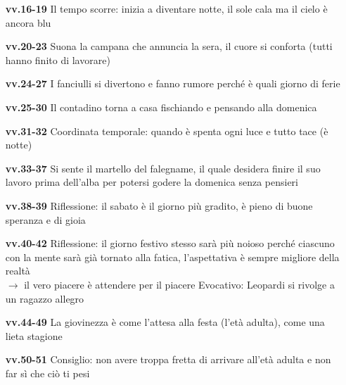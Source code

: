 \documentclass{article}
\begin{document}
\begin{multicols}{2}
{\begin{itemize}
            Donzella diventerà vecchietta / Vecchietta è stata donzella, la donzella è molto
            dinamica, la vecchietta è ferma e seduta
        \item[\textbf{vv.16-19}] Il tempo scorre: inizia a diventare notte, il sole cala ma il cielo è ancora blu
        \item[\textbf{vv.20-23}] Suona la campana che annuncia la sera, il cuore si conforta (tutti hanno finito di lavorare)
        \item[\textbf{vv.24-27}] I fanciulli si divertono e fanno rumore perché è quali giorno di ferie
        \item[\textbf{vv.25-30}] Il contadino torna a casa fischiando e pensando alla domenica 
        \item[\textbf{vv.31-32}] Coordinata temporale: quando è spenta ogni luce e tutto tace (è notte)
        \item[\textbf{vv.33-37}] Si sente il martello del falegname, il quale desidera finire
            il suo lavoro prima dell'alba per potersi godere la domenica senza pensieri
        \item[\textbf{vv.38-39}] Riflessione: il sabato è il giorno più gradito, è pieno di
            buone speranza e di gioia
        \item[\textbf{vv.40-42}] Riflessione: il giorno festivo stesso sarà più noioso perché
            ciascuno con la mente sarà già tornato alla fatica, l'aspettativa è sempre migliore
            della realtà\\
            $\rightarrow$ il vero piacere è attendere per il piacere
         Evocativo: Leopardi si rivolge a un ragazzo allegro
        \item[\textbf{vv.44-49}] La giovinezza è come l'attesa alla festa (l'età adulta), come
            una lieta stagione
        \item[\textbf{vv.50-51}] Consiglio: non avere troppa fretta di arrivare all'età adulta
            e non far sì che ciò ti pesi
\end{itemize}}
\end{multicols}
\end{document}
